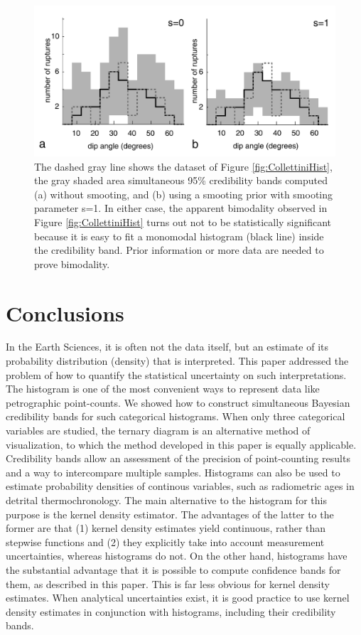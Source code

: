 \documentclass{article}
\begin{document}
\begin{figure}[h]
  \centering
  \includegraphics[width=.8\textwidth]{CollettiniFig.pdf}
  \caption{
The    dashed    gray   line    shows    the    dataset   of    Figure
\ref{fig:CollettiniHist},  the  gray  shaded  area  simultaneous  95\%
credibility  bands computed  (a)  without smooting,  and  (b) using  a
smooting  prior with  smooting  parameter s=1.   In  either case,  the
apparent bimodality observed  in Figure \ref{fig:CollettiniHist} turns
out not  to be statistically significant  because it is easy  to fit a
monomodal histogram  (black line) inside the  credibility band.  Prior
information or more data are needed to prove bimodality.}
  \label{fig:bimodal}
\end{figure}

\clearpage

\section{Conclusions} \label{sec:conclusions}

In  the Earth  Sciences,  it is  often  not the  data  itself, but  an
estimate   of   its  probability   distribution   (density)  that   is
interpreted. This paper  addressed the problem of how  to quantify the
statistical uncertainty on such interpretations.  The histogram is one
of  the  most convenient  ways  to  represent  data like  petrographic
point-counts.   We  showed  how  to  construct  simultaneous  Bayesian
credibility bands  for such  categorical histograms.  When  only three
categorical  variables   are  studied,  the  ternary   diagram  is  an
alternative method of visualization,  to which the method developed in
this  paper  is  equally   applicable.   Credibility  bands  allow  an
assessment of  the precision  of point-counting results  and a  way to
intercompare  multiple  samples.   Histograms  can  also  be  used  to
estimate  probability  densities   of  continous  variables,  such  as
radiometric ages  in detrital thermochronology.   The main alternative
to the  histogram for  this purpose is  the kernel  density estimator.
The advantages of the latter to the former are that (1) kernel density
estimates  yield continuous,  rather than  stepwise functions  and (2)
they explicitly  take into account  measurement uncertainties, whereas
histograms do not.  On the other hand, histograms have the substantial
advantage that it is possible to compute confidence bands for them, as
described in this paper.  This  is far less obvious for kernel density
estimates.  When  analytical uncertainties exist, it  is good practice
to  use  kernel  density  estimates in  conjunction  with  histograms,
including their credibility bands.\\
\end{document}
